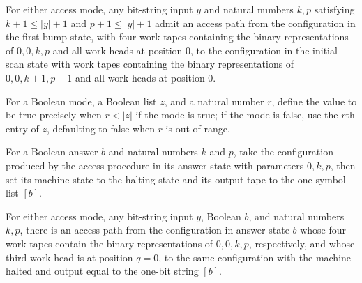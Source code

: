 \begin{lemma}
\label{Complexity.LogProg.access_bump}
\leanok
{}
For either access mode, any bit-string input $y$ and natural numbers $k,p$ satisfying
$k+1\le |y|+1$ and $p+1\le |y|+1$ admit an access path from the configuration in the
first bump state, with four work tapes containing the binary representations of
$0,0,k,p$ and all work heads at position $0$, to the configuration in the initial scan
state with work tapes containing the binary representations of $0,0,k+1,p+1$ and all
work heads at position $0$.
\end{lemma}

\begin{definition}
\label{Complexity.LogProg.accessValue}
\leanok
For a Boolean mode, a Boolean list $z$, and a natural number $r$, define the value to be
true precisely when $r<|z|$ if the mode is true; if the mode is false, use the $r$th
entry of $z$, defaulting to false when $r$ is out of range.
\end{definition}

\begin{definition}
\label{Complexity.LogProg.accessDone}
\leanok
{}
For a Boolean answer $b$ and natural numbers $k$ and $p$, take the configuration
produced by the access procedure in its answer state with parameters $0,k,p$, then set
its machine state to the halting state and its output tape to the one-symbol list $[b]$.
\end{definition}

\begin{lemma}
\label{Complexity.LogProg.access_answer}
\leanok
{}
For either access mode, any bit-string input $y$, Boolean $b$, and natural numbers
$k,p$, there is an access path from the configuration in answer state $b$ whose four
work tapes contain the binary representations of $0,0,k,p$, respectively, and whose
third work head is at position $q=0$, to the same configuration with the machine halted
and output equal to the one-bit string $[b]$.
\end{lemma}

